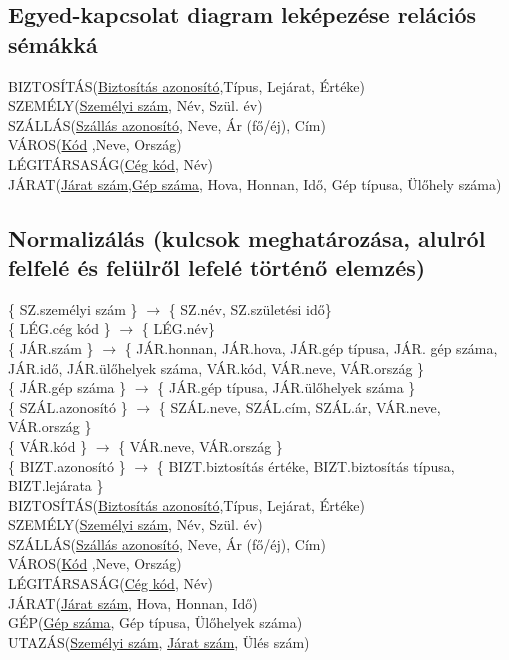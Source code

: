 \subsection{Egyed-kapcsolat diagram leképezése relációs sémákká}

    BIZTOSÍTÁS(\underline{Biztosítás azonosító},Típus, Lejárat, Értéke)\\
    SZEMÉLY(\underline{Személyi szám}, Név, Szül. év)\\
    SZÁLLÁS(\underline{Szállás azonosító}, Neve, Ár (fő/éj), Cím)\\
    VÁROS(\underline{Kód} ,Neve, Ország)\\
    LÉGITÁRSASÁG(\underline{Cég kód}, Név)\\
    JÁRAT(\underline{Járat szám},\underline{Gép száma}, Hova, Honnan, Idő, Gép típusa, Ülőhely száma)

\subsection{Normalizálás (kulcsok meghatározása, alulról felfelé és felülről lefelé történő elemzés)}

\{ SZ.személyi szám \} $\rightarrow$ \{ SZ.név, SZ.születési idő\} \\
\{ LÉG.cég kód \} $\rightarrow$ \{ LÉG.név\} \\
\{ JÁR.szám \} $\rightarrow$ \{ JÁR.honnan, JÁR.hova, JÁR.gép típusa, JÁR. gép száma, JÁR.idő, JÁR.ülőhelyek száma, VÁR.kód, VÁR.neve, VÁR.ország \} \\
\{ JÁR.gép száma \} $\rightarrow$ \{ JÁR.gép típusa, JÁR.ülőhelyek száma \} \\
\{ SZÁL.azonosító \} $\rightarrow$ \{ SZÁL.neve, SZÁL.cím, SZÁL.ár, VÁR.neve, VÁR.ország \} \\
\{ VÁR.kód \} $\rightarrow$ \{ VÁR.neve, VÁR.ország \} \\
\{ BIZT.azonosító \} $\rightarrow$ \{ BIZT.biztosítás értéke, BIZT.biztosítás típusa, BIZT.lejárata \} \\
BIZTOSÍTÁS(\underline{Biztosítás azonosító},Típus, Lejárat, Értéke)\\
SZEMÉLY(\underline{Személyi szám}, Név, Szül. év)\\
SZÁLLÁS(\underline{Szállás azonosító}, Neve, Ár (fő/éj), Cím)\\
VÁROS(\underline{Kód} ,Neve, Ország)\\
LÉGITÁRSASÁG(\underline{Cég kód}, Név)\\
JÁRAT(\underline{Járat szám}, Hova, Honnan, Idő)\\
GÉP(\underline{Gép száma}, Gép típusa, Ülőhelyek száma)\\
UTAZÁS(\underline{Személyi szám}, \underline{Járat szám}, Ülés szám)
